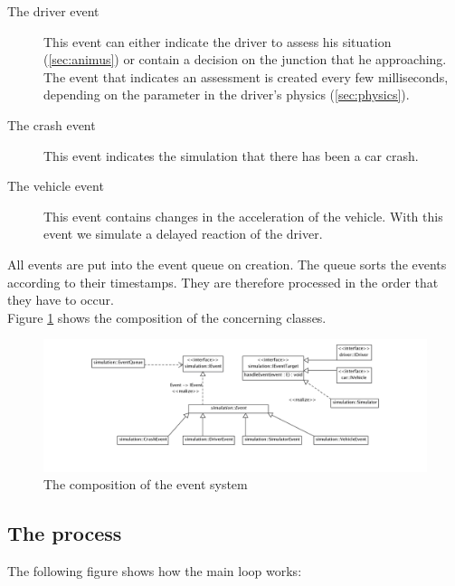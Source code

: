 \begin{description}
\item[The driver event] This event can either indicate the driver
to assess his situation (\ref{sec:animus}) or contain a decision on the 
junction that he approaching. The event that indicates an assessment
is created every few milliseconds, depending on the parameter in the driver's
physics (\ref{sec:physics}).
\item[The crash event]
This event indicates the simulation that there has been a car crash.
\item[The vehicle event]
This event contains changes in the acceleration of the vehicle. With this 
event we simulate a delayed reaction of the driver.
\end{description}

\noindent All events are put into the event queue on creation. The queue sorts the
events according to their timestamps. They are therefore processed in the
order that they have to occur. \\

\noindent Figure \ref{fig:eventSystem} shows the composition of the 
concerning classes. \\

\begin{figure}[H]
\begin{center}
\includegraphics[width=\textwidth]{images/eventsystem.png}
\end{center}
\caption{The composition of the event system}
\label{fig:eventSystem}
\end{figure}

\subsection{The process}
\label{sec:process}

The following figure shows how the main loop works:


